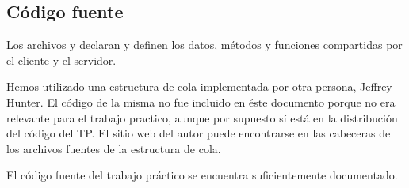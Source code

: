 \subsection{Código fuente}

Los archivos  y  declaran y definen los
datos, métodos y funciones compartidas por el cliente y el servidor.

Hemos utilizado una estructura de cola implementada por otra persona, Jeffrey
Hunter. El código de la misma no fue incluido en éste documento porque no era
relevante para el trabajo practico, aunque por supuesto sí está en la 
distribución del código del TP. El sitio web
del autor puede encontrarse en las cabeceras de los archivos fuentes de la
estructura de cola.

El código fuente del trabajo práctico se encuentra suficientemente documentado.






